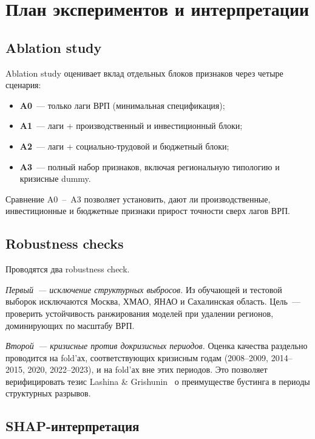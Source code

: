 \documentclass[12pt,a4paper]{article}
\begin{document}
\section{План экспериментов и интерпретации}

\subsection{Ablation study}

Ablation study оценивает вклад отдельных блоков признаков через четыре
сценария:
\begin{itemize}
  \item \textbf{A0}~--- только лаги ВРП (минимальная спецификация);
  \item \textbf{A1}~--- лаги + производственный и инвестиционный блоки;
  \item \textbf{A2}~--- лаги + социально-трудовой и бюджетный блоки;
  \item \textbf{A3}~--- полный набор признаков, включая региональную
                        типологию и кризисные dummy.
\end{itemize}
Сравнение A0~--~A3 позволяет установить, дают ли производственные,
инвестиционные и бюджетные признаки прирост точности сверх лагов ВРП.

\subsection{Robustness checks}

Проводятся два robustness check.

\textit{Первый~--- исключение структурных выбросов.} Из обучающей и
тестовой выборок исключаются Москва, ХМАО, ЯНАО и Сахалинская область.
Цель~--- проверить устойчивость ранжирования моделей при удалении
регионов, доминирующих по масштабу ВРП.

\textit{Второй~--- кризисные против докризисных периодов.} Оценка
качества раздельно проводится на fold'ах, соответствующих кризисным годам
(2008--2009, 2014--2015, 2020, 2022--2023), и на fold'ах вне этих периодов.
Это позволяет верифицировать тезис Lashina \& Grishunin~\cite{lashina2023}
о преимуществе бустинга в периоды структурных разрывов.

\subsection{SHAP-интерпретация}
\end{document}
